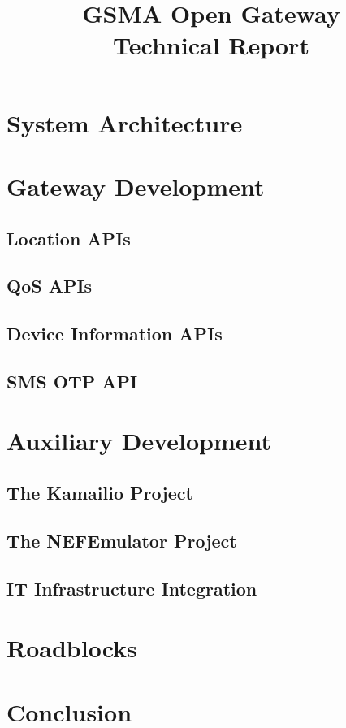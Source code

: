 \documentclass[code,math,bibliography]{relatorio-deti}
\title{GSMA Open Gateway\\[20pt]Technical Report}
\begin{document}
\maketitle

%
%



\tableofcontents

\clearpage







\chapter{System Architecture}

\chapter{Gateway Development}
\section{Location APIs}
\section{QoS APIs}
\section{Device Information APIs}
\section{SMS OTP API}

\chapter{Auxiliary Development}
\section{The Kamailio Project}
\section{The NEFEmulator Project}
\section{IT Infrastructure Integration}

\chapter{Roadblocks}

\chapter{Conclusion}

\printbibliography[heading=bibintoc]
\end{document}
